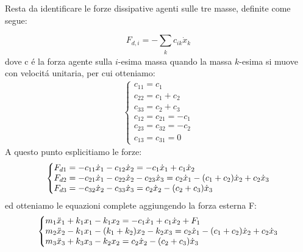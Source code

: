 \documentclass[12pt,a4paper]{article}
\makeatletter
\newenvironment{sistema}%
  {\left\lbrace\begin{array}{@{}l@{}}}%
  {\end{array}\right.}
\makeatother
\begin{document}
 		Resta da identificare le forze dissipative agenti sulle tre masse, definite come segue:
 		
		\begin{equation}
 			F_{ d,i} = - \sum_{\substack{k}} c_{ik} \dot{x}_k
 		\end{equation}
 		dove c \'e la forza agente sulla $i$-esima massa quando la massa $k$-esima si muove con velocit\'a unitaria, per cui otteniamo:
		\begin{gather}
 		\begin{cases}
		c_{11} = c_{1}
		\\
		c_{22} = c_{1} + c_{2}
		\\
		c_{33} = c_{2} + c_{3}
		\\
		c_{12} = c_{21} = - c_{1}
		\\
		c_{23} = c_{32} = - c_{2}
		\\
		c_{13} = c_{31} = 0
		\end{cases}
		\end{gather}
		A questo punto esplicitiamo le forze:
		\begin{gather}
		\begin {sistema}
		F_{d1} = - c_{11}\dot x_1 - c_{12}\dot x_2 = -c_1 \dot x_1 + c_1 \dot x_2
		\\
		F_{d2} = - c_{21}\dot x_1 - c_{22}\dot x_2 - c_{23}\dot x_3 = c_2  \dot x_1  - (c_1 + c_2) \dot x_2 + c_2\dot x_3
		\\
		F_{d3} = - c_{32}\dot x_2 - c_{33}\dot x_3 = c_2 \dot x_2 - (c_2 + c_3) \dot x_3		
		\end{sistema}
		\end{gather}
 		ed otteniamo le equazioni complete aggiungendo la forza esterna F:
		\begin{gather}
		\begin {sistema}
		m_1 \ddot{x}_1 + k_1x_1 - k_1 x_2  =  -c_1 \dot x_1 + c_1 \dot x_2 +F_1
		\\
		m_2 \ddot{x}_2 - k_1 x_1 - (k_1 +k_2 )x_2 - k_2 x_3 = c_2  \dot x_1  - (c_1 + c_2) \dot x_2 + c_2\dot x_3
		\\
		m_3 \ddot{x}_3 + k_3 x_3 -k_2 x_2= c_2 \dot x_2 - (c_2 + c_3) \dot x_3
		\end{sistema}
		\end{gather}
		
\end{document}
